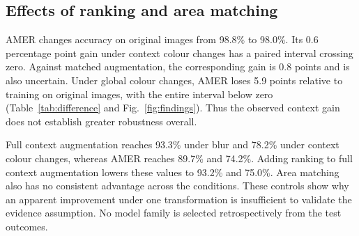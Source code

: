 \subsection{Effects of ranking and area matching}
AMER changes accuracy on original images from 98.8\% to 98.0\%. Its 0.6 percentage point gain under context colour changes has a paired interval crossing zero. Against matched augmentation, the corresponding gain is 0.8 points and is also uncertain. Under global colour changes, AMER loses 5.9 points relative to training on original images, with the entire interval below zero (Table~\ref{tab:difference} and Fig.~\ref{fig:findings}). Thus the observed context gain does not establish greater robustness overall.

Full context augmentation reaches 93.3\% under blur and 78.2\% under context colour changes, whereas AMER reaches 89.7\% and 74.2\%. Adding ranking to full context augmentation lowers these values to 93.2\% and 75.0\%. Area matching also has no consistent advantage across the conditions. These controls show why an apparent improvement under one transformation is insufficient to validate the evidence assumption. No model family is selected retrospectively from the test outcomes.
